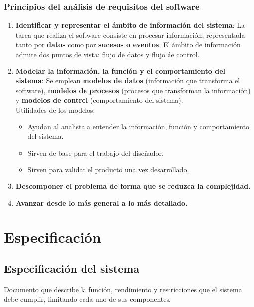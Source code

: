 \subsubsection{Principios del análisis de requisitos del software}
\begin{enumerate}
    \item \textbf{Identificar y representar el ámbito de información del sistema}: La tarea que realiza el software consiste en procesar información, representada tanto por \textbf{datos} como por \textbf{sucesos o eventos}. El ámbito de información admite dos puntos de vista: flujo de datos y flujo de control.
    \item \textbf{Modelar la información, la función y el comportamiento del sistema}: Se emplean \textbf{modelos de datos} (información que transforma el software), \textbf{modelos de procesos} (procesos que transforman la información) y \textbf{modelos de control} (comportamiento del sistema).\\
    Utilidades de los modelos:
    \begin{itemize}
        \item Ayudan al analista a entender la información, función y comportamiento del sistema.
        \item Sirven de base para el trabajo del diseñador.
        \item Sirven para validar el producto una vez desarrollado.
    \end{itemize}
    \item \textbf{Descomponer el problema de forma que se reduzca la complejidad.}
    \item \textbf{Avanzar desde lo más general a lo más detallado.}
\end{enumerate}


\section{Especificación}

\subsection{Especificación del sistema} 
Documento que describe la función, rendimiento y restricciones que el sistema debe cumplir, limitando cada uno de sus componentes.\\

